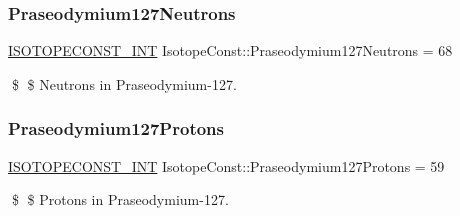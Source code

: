 \subsubsection{\texorpdfstring{Praseodymium127\+Neutrons}{Praseodymium127Neutrons}}
{\footnotesize\ttfamily \mbox{\hyperlink{group___isotope_const-_macros_ga5f18360b3e99483a35c32d789e62621c}{I\+S\+O\+T\+O\+P\+E\+C\+O\+N\+S\+T\+\_\+\+I\+NT}} Isotope\+Const\+::\+Praseodymium127\+Neutrons = 68}

\$ \$ Neutrons in Praseodymium-\/127. \mbox{\label{group___isotope_const-_praseodymium-_pr127_ga803cd454c1952420a778909727a72097}} 
\subsubsection{\texorpdfstring{Praseodymium127\+Protons}{Praseodymium127Protons}}
{\footnotesize\ttfamily \mbox{\hyperlink{group___isotope_const-_macros_ga5f18360b3e99483a35c32d789e62621c}{I\+S\+O\+T\+O\+P\+E\+C\+O\+N\+S\+T\+\_\+\+I\+NT}} Isotope\+Const\+::\+Praseodymium127\+Protons = 59}

\$ \$ Protons in Praseodymium-\/127. 